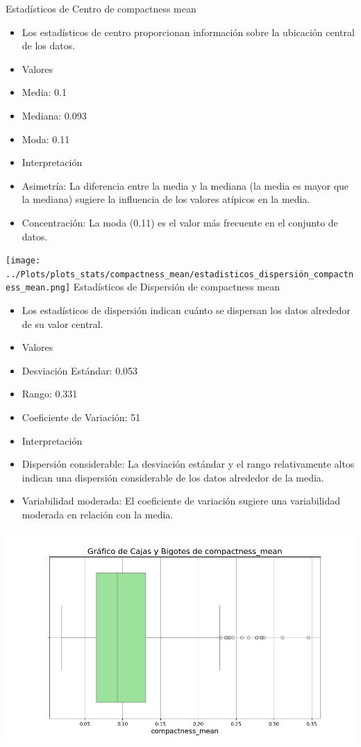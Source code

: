 \documentclass[a4paper, 12pt]{article}
\begin{document}
Estadísticos de Centro de compactness mean
\begin{itemize}
\item Los estadísticos de centro proporcionan información sobre la ubicación central de los datos.
\item Valores

\item Media: 0.1
\item Mediana: 0.093
\item Moda: 0.11
\item Interpretación

\item Asimetría: La diferencia entre la media y la mediana (la media es mayor que la mediana) sugiere la influencia de los valores atípicos en la media.
\item Concentración: La moda (0.11) es el valor más frecuente en el conjunto de datos.
\end{itemize}

\texttt{[image: ../Plots/plots\_stats/compactness\_mean/estadisticos\_dispersión\_compactness\_mean.png]}
Estadísticos de Dispersión de compactness mean
\begin{itemize}
\item Los estadísticos de dispersión indican cuánto se dispersan los datos alrededor de su valor central.

\item Valores

\item Desviación Estándar: 0.053
\item Rango: 0.331
\item Coeficiente de Variación: 51%
\item Interpretación

\item Dispersión considerable: La desviación estándar y el rango relativamente altos indican una dispersión considerable de los datos alrededor de la media.
\item Variabilidad moderada: El coeficiente de variación sugiere una variabilidad moderada en relación con la media.
\end{itemize}


\includegraphics[width=\textwidth]{../Plots/plots_stats/compactness_mean/boxplot_compactness_mean.png}
\end{document}
